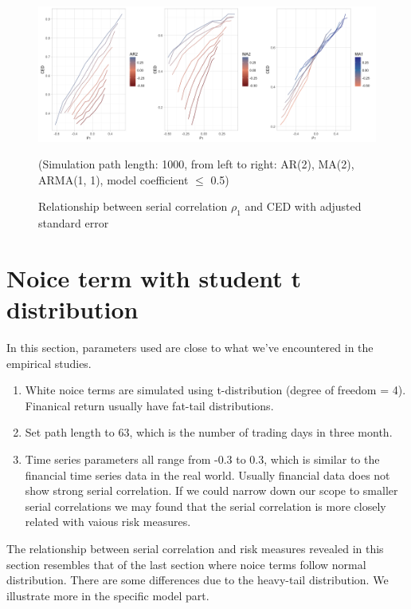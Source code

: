 \documentclass[11pt]{article}
\begin{document}
\begin{figure}[H]
\centering
\includegraphics[width = 1\textwidth]{../figures/simulation/aggregated_adjsd_subset}
\caption{Relationship between serial correlation $\rho_1$ and CED with adjusted standard error}
(Simulation path length: 1000, from left to right: AR(2), MA(2), ARMA(1, 1), model coefficient $\leq$ 0.5)
\label{fig:aggregated_adjsd_subset}
\end{figure}


\section{Noice term with student t distribution}

In this section, parameters used are close to what we've encountered in the empirical studies. 
\begin{enumerate}
\item White noice terms are simulated using t-distribution (degree of freedom = 4). Finanical return usually have fat-tail distributions.
\item Set path length to 63, which is the number of trading days in three month.
\item Time series parameters all range from -0.3 to 0.3, which is similar to the financial time series data in the real world. Usually financial data does not show strong serial correlation. If we could narrow down our scope to smaller serial correlations we may found that the serial correlation is more closely related with vaious risk measures.
\end{enumerate}

The relationship between serial correlation and risk measures revealed in this section resembles that of the last section where noice terms follow normal distribution. There are some differences due to the heavy-tail distribution. We illustrate more in the specific model part.
\end{document}
